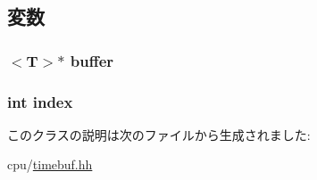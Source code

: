 \subsection{変数}
\hypertarget{classTimeBuffer_1_1wire_ad36b7f8216dc8ccf9d9820d3f763d563}{
\subsubsection[{buffer}]{$<$T$>$$\ast$ {\bf buffer}}}
\label{classTimeBuffer_1_1wire_ad36b7f8216dc8ccf9d9820d3f763d563}
\hypertarget{classTimeBuffer_1_1wire_a750b5d744c39a06bfb13e6eb010e35d0}{
\subsubsection[{index}]{\setlength{\rightskip}{0pt plus 5cm}int {\bf index}}}
\label{classTimeBuffer_1_1wire_a750b5d744c39a06bfb13e6eb010e35d0}


このクラスの説明は次のファイルから生成されました:\begin{DoxyCompactItemize}
\item 
cpu/\hyperlink{timebuf_8hh}{timebuf.hh}\end{DoxyCompactItemize}

